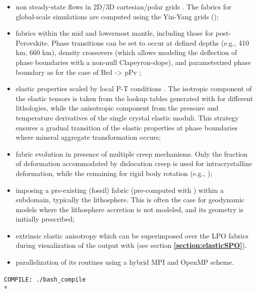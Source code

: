 \begin{itemize}
    \item non steady-state flows in 2D/3D cartesian/polar grids \citep{faccenda2013g3,hu2017EPSL}. The fabrics for global-scale simulations are computed using the Yin-Yang grids (\citet{kageyama2004g3});
    
    \item fabrics within the mid and lowermost mantle, including those for post-Perovskite. Phase transitions can be set to occur at defined depths (e.g., 410 km, 660 km), density crossovers (which allows modeling the deflection of phase boundaries with a non-null Clapeyron-slope), and parameterized phase boundary as for the case of Brd -> pPv \citep{oganov2004nature};  
    
    \item elastic properties scaled by local P-T conditions \citep{faccenda2014pepi,chang2016natcomm,ferreira2019natgeo}. The isotropic component of the elastic tensors is taken from the lookup tables generated with \mmaeostitle{} for different lithologies, while the anisotropic component from the pressure and temperature derivatives of the single crystal elastic moduli. This strategy ensures a gradual transition of the elastic properties at phase boundaries where mineral aggregate transformation occurs;
    
    \item fabric evolution in presence of multiple creep mechanisms. Only the fraction of deformation accommodated by dislocation creep is used for intracrystalline deformation, while the remaining for rigid body rotation (e.g., \citep{hedjazian2017EPSL});
    
    \item imposing a pre-existing (fossil) fabric (pre-computed with \drexstitle{}) within a subdomain, typically the lithosphere. This is often the case for geodynamic models where the lithosphere accretion is not modeled, and its geometry is initially prescribed;
    
    \item extrinsic elastic anisotropy \citep{faccenda2014pepi,sturgeon2019g3} which can be superimposed over the LPO fabrics during visualization of the output with \viztomotitle{} (see section \textbf{\ref{section:elasticSPO}}).
    
    \item parallelization of its routines using a hybrid MPI and OpenMP scheme.

\end{itemize}
\vspace{0.5cm}
\texttt{COMPILE: ./bash\_compile}\\*

